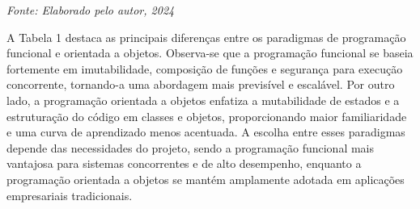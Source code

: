 \begin{center}
    \textit{Fonte: Elaborado pelo autor, 2024} %
\end{center}

\vspace{1cm}
A Tabela 1 destaca as principais diferenças entre os paradigmas de programação funcional e orientada a objetos. Observa-se que a programação funcional se baseia fortemente em imutabilidade, composição de funções e segurança para execução concorrente, tornando-a uma abordagem mais previsível e escalável. Por outro lado, a programação orientada a objetos enfatiza a mutabilidade de estados e a estruturação do código em classes e objetos, proporcionando maior familiaridade e uma curva de aprendizado menos acentuada. A escolha entre esses paradigmas depende das necessidades do projeto, sendo a programação funcional mais vantajosa para sistemas concorrentes e de alto desempenho, enquanto a programação orientada a objetos se mantém amplamente adotada em aplicações empresariais tradicionais.

